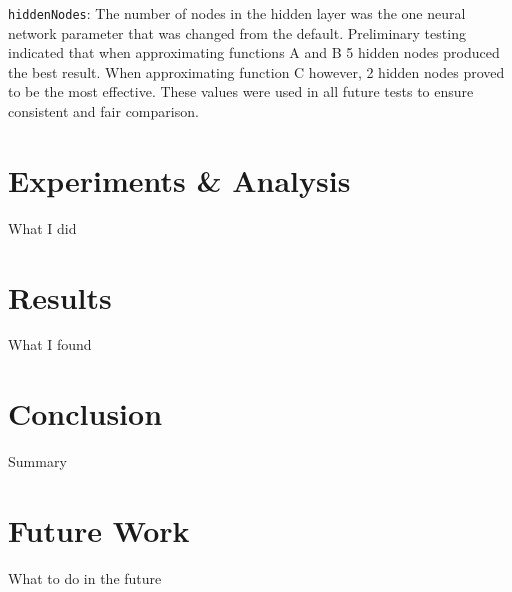 		\texttt{hiddenNodes}: The number of nodes in the hidden layer was the one neural network parameter that was changed from the default. Preliminary testing indicated that when approximating functions A and B 5 hidden nodes produced the best result. When approximating function C however, 2 hidden nodes proved to be the most effective. These values were used in all future tests to ensure consistent and fair comparison. 
		
\section{Experiments \& Analysis}
	What I did

\section{Results}
	What I found

\section{Conclusion}
	Summary

\section{Future Work}
	What to do in the future
	